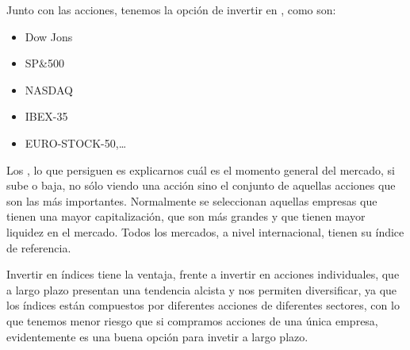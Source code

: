 Junto con las acciones, tenemos la opción de invertir en , como son:
\begin{itemize}
    \item Dow Jons
    \item SP\&500 
    \item NASDAQ
    \item IBEX-35
    \item EURO-STOCK-50,\ldots
\end{itemize}

Los , lo que persiguen es explicarnos cuál es el momento general del mercado, si sube o baja, no sólo viendo una acción sino el conjunto de aquellas acciones que son las más importantes. Normalmente se seleccionan aquellas empresas que tienen una mayor capitalización, que son más grandes y que tienen mayor liquidez en el mercado. Todos los mercados, a nivel internacional, tienen su índice de referencia.

Invertir en índices tiene la ventaja, frente a invertir en acciones individuales, que a largo plazo presentan una tendencia alcista y nos permiten diversificar, ya que los índices están compuestos por diferentes acciones de diferentes sectores, con lo que tenemos menor riesgo que si compramos acciones de una única empresa, evidentemente es una buena opción para invetir a largo plazo.

